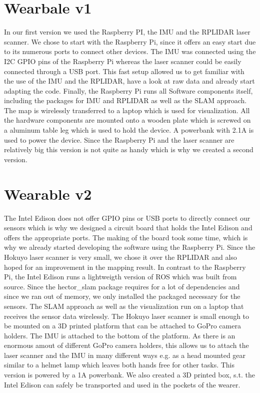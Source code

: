 \documentclass{sigchi-ext}
\begin{document}
\section{Wearbale v1}
In our first version we used the Raspberry PI, the IMU and the RPLIDAR laser scanner. We chose to start with the Raspberry Pi, since it offers an easy start due to its numerous ports to connect other devices. The IMU was connected using the I2C GPIO pins of the Raspberry Pi whereas the laser scanner could be easily connected through a USB port. This fast setup allowed us to get familiar with the use of the IMU and the RPLIDAR, have a look at raw data and already start adapting the code. Finally, the Raspberry Pi runs all Software components itself, including the packages for IMU and RPLIDAR as well as the SLAM approach. The map is wirelessly transferred to a laptop which is used for visualization. All the hardware components are mounted onto a wooden plate which is screwed on a aluminum table leg which is used to hold the device. A powerbank with 2.1A is used to power the device. Since the Raspberry Pi and the laser scanner are relatively big this version is not quite as handy which is why we created a second version.

\section{Wearable v2}
The Intel Edison does not offer GPIO pins or USB ports to directly connect our sensors which is why we designed a circuit board that holds the Intel Edison and offers the appropriate ports. The making of the board took some time, which is why we already started developing the software using the Raspberry Pi. Since the Hokuyo laser scanner is very small, we chose it over the RPLIDAR and also hoped for an improvement in the mapping result. In contrast to the Raspberry Pi, the Intel Edison runs a lightweigth version of ROS which was built from source. Since the hector\_slam package requires for a lot of dependencies and since we ran out of memory, we only installed the packaged necessary for the sensors. The SLAM approach as well as the visualization run on a laptop that receives the sensor data wirelessly. The Hokuyo laser scanner is small enough to be mounted on a 3D printed platform that can be attached to GoPro camera holders. The IMU is attached to the bottom of the platform. As there is an enormous amout of different GoPro camera holders, this allows us to attach the laser scanner and the IMU in many different ways e.g. as a head mounted gear similar to a helmet lamp which leaves both hands free for other tasks. This version is powered by a 1A powerbank. We also created a 3D printed box, s.t. the Intel Edison can safely be transported and used in the pockets of the wearer. 
\end{document}
